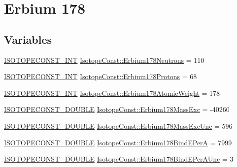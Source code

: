 \hypertarget{group___isotope_const-_erbium-_er178}{}\section{Erbium 178}
\label{group___isotope_const-_erbium-_er178}
\subsection*{Variables}
\begin{DoxyCompactItemize}
\item 
\mbox{\hyperlink{group___isotope_const-_macros_ga5f18360b3e99483a35c32d789e62621c}{I\+S\+O\+T\+O\+P\+E\+C\+O\+N\+S\+T\+\_\+\+I\+NT}} \mbox{\hyperlink{group___isotope_const-_erbium-_er178_ga629cb79a4c930379b31490f69fbc6469}{Isotope\+Const\+::\+Erbium178\+Neutrons}} = 110
\item 
\mbox{\hyperlink{group___isotope_const-_macros_ga5f18360b3e99483a35c32d789e62621c}{I\+S\+O\+T\+O\+P\+E\+C\+O\+N\+S\+T\+\_\+\+I\+NT}} \mbox{\hyperlink{group___isotope_const-_erbium-_er178_ga8216403a5dc1ababd38ad54a1386c827}{Isotope\+Const\+::\+Erbium178\+Protons}} = 68
\item 
\mbox{\hyperlink{group___isotope_const-_macros_ga5f18360b3e99483a35c32d789e62621c}{I\+S\+O\+T\+O\+P\+E\+C\+O\+N\+S\+T\+\_\+\+I\+NT}} \mbox{\hyperlink{group___isotope_const-_erbium-_er178_gaba86f4792a6fc5c04784bcb57a9a0a09}{Isotope\+Const\+::\+Erbium178\+Atomic\+Weight}} = 178
\item 
\mbox{\hyperlink{group___isotope_const-_macros_ga8f45a7272ce02c0b4c65c44636ed719a}{I\+S\+O\+T\+O\+P\+E\+C\+O\+N\+S\+T\+\_\+\+D\+O\+U\+B\+LE}} \mbox{\hyperlink{group___isotope_const-_erbium-_er178_ga26884b439fc771ca997bdee6d91b808c}{Isotope\+Const\+::\+Erbium178\+Mass\+Exc}} = -\/40260
\item 
\mbox{\hyperlink{group___isotope_const-_macros_ga8f45a7272ce02c0b4c65c44636ed719a}{I\+S\+O\+T\+O\+P\+E\+C\+O\+N\+S\+T\+\_\+\+D\+O\+U\+B\+LE}} \mbox{\hyperlink{group___isotope_const-_erbium-_er178_ga8c034439a2972b9b35cb63d1f53e94d6}{Isotope\+Const\+::\+Erbium178\+Mass\+Exc\+Unc}} = 596
\item 
\mbox{\hyperlink{group___isotope_const-_macros_ga8f45a7272ce02c0b4c65c44636ed719a}{I\+S\+O\+T\+O\+P\+E\+C\+O\+N\+S\+T\+\_\+\+D\+O\+U\+B\+LE}} \mbox{\hyperlink{group___isotope_const-_erbium-_er178_ga376b7fec9fa7ab9266d92e4fb97b25b4}{Isotope\+Const\+::\+Erbium178\+Bind\+E\+PerA}} = 7999
\item 
\mbox{\hyperlink{group___isotope_const-_macros_ga8f45a7272ce02c0b4c65c44636ed719a}{I\+S\+O\+T\+O\+P\+E\+C\+O\+N\+S\+T\+\_\+\+D\+O\+U\+B\+LE}} \mbox{\hyperlink{group___isotope_const-_erbium-_er178_ga0b365d5f8107a33cc733fcf76c1be11c}{Isotope\+Const\+::\+Erbium178\+Bind\+E\+Per\+A\+Unc}} = 3

\end{DoxyCompactItemize}
